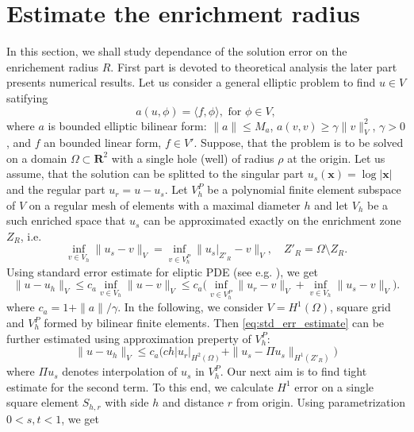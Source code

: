 \documentclass[preprint,12pt]{elsarticle}
\def\vc#1{\mathbf{\boldsymbol{#1}}}     %
\def\abs#1{\left|#1\right|}
\def\norm#1{\| #1 \|}
\def\abs#1{| #1 |}
\newcommand{\R}{\mathbf{R}}
\begin{document}
\section{Estimate the enrichment radius}
In this section, we shall study dependance of the solution error on the enrichement radius $R$. First part is devoted to 
theoretical analysis the later part presents numerical results.
Let us consider a general elliptic problem to find $u\in V$ satifying
\[
   a(u, \phi) = \langle f, \phi \rangle, \text{ for } \phi \in V,
\]
where $a$ is bounded elliptic bilinear form: $\norm{a}\le M_a$, $a(v, v) \ge \gamma \norm{v}_V^2$, $\gamma>0$, and $f$ an bounded linear form, $f\in V'$. 
Suppose, that the problem is to be solved on a domain $\Omega \subset \R^2$ with a single hole (well) of radius $\rho$ at the origin. 
Let us assume, that the solution can be splitted to the singular part $u_s(\vc x)= \log |\vc x|$ and the regular part $u_r=u-u_s$.
Let $V^P_h$ be a polynomial finite element subspace of $V$ on a regular mesh of elements with a maximal diameter $h$
and let $V_h$ be a such enriched space that $u_s$ can be approximated exactly on the enrichment zone $Z_R$, i.e.
\[
   \inf_{v\in V_h} \norm{u_s - v}_V = \inf_{v\in V^P_h} \norm{u_s|_{Z'_R} - v}_V, \quad Z'_R = \Omega\setminus Z_R.
\]
Using standard error estimate for eliptic PDE (see e.g. \cite{ciarlet_basic_1991}), we get
\begin{equation}
    \label{eq:std_err_estimate}
    \norm{u - u_h}_{V} \le c_a \inf_{v \in V_h} \norm{u - v}_{V} 
    \le c_a \big(\inf_{v \in V^P_h} \norm{u_r - v}_{V} + \inf_{v \in V_h} \norm{u_s - v}_{V} \big).   
\end{equation}
where $c_a=1+\norm{a}/\gamma$.
In the following, we consider $V=H^1(\Omega)$, square grid and $V^P_h$ formed by bilinear finite elements. 
Then \eqref{eq:std_err_estimate} can be further estimated using approximation preperty of $V^P_h$:
\begin{equation}
    \label{eq:particular_estimate}
    \norm{u - u_h}_{V} \le c_a \big(c h \abs{u_r}_{H^2(\Omega)} + \norm{u_s - \Pi u_s}_{H^1(Z'_R)} \big)   
\end{equation}
where $\Pi u_s$ denotes interpolation of $u_s$ in $V^P_h$. Our next aim is to find tight estimate for the second term.
To this end, we calculate $H^1$ error on a single square element $S_{h,r}$ with side $h$ and distance $r$ from origin.
Using parametrization $0<s,t<1$,  we get
\end{document}
